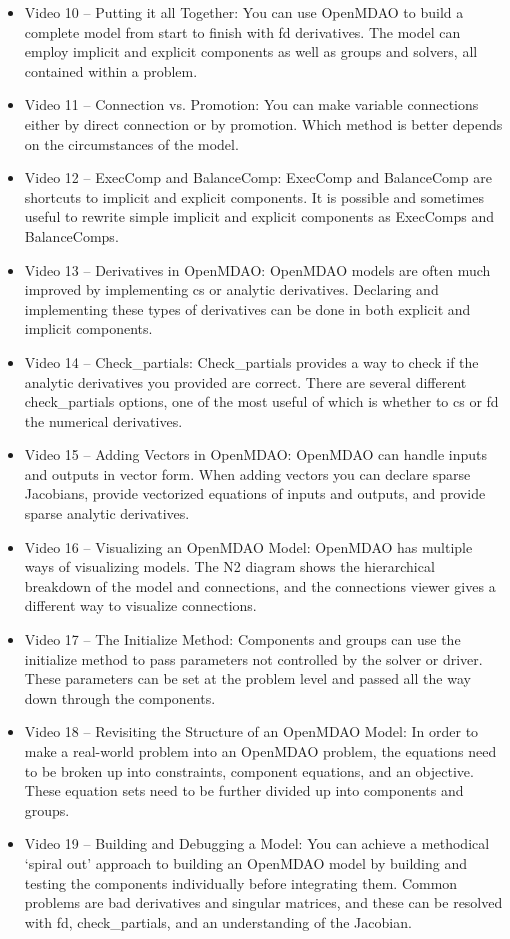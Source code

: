 \documentclass[12pt, letterpaper]{article}
\begin{document}
\begin{itemize}
	\item Video 10 – Putting it all Together: You can use OpenMDAO to build a complete model from start to finish with fd derivatives. The model can employ implicit and explicit components as well as groups and solvers, all contained within a problem.
	\item Video 11 – Connection vs. Promotion: You can make variable connections either by direct connection or by promotion. Which method is better depends on the circumstances of the model.
	\item Video 12 – ExecComp and BalanceComp: ExecComp and BalanceComp are shortcuts to implicit and explicit components. It is possible and sometimes useful to rewrite simple implicit and explicit components as ExecComps and BalanceComps.
	\item Video 13 – Derivatives in OpenMDAO: OpenMDAO models are often much improved by implementing cs or analytic derivatives. Declaring and implementing these types of derivatives can be done in both explicit and implicit components.
	\item Video 14 – Check\_partials: Check\_partials provides a way to check if the analytic derivatives you provided are correct. There are several different check\_partials options, one of the most useful of which is whether to cs or fd the numerical derivatives.
	\item Video 15 – Adding Vectors in OpenMDAO: OpenMDAO can handle inputs and outputs in vector form. When adding vectors you can declare sparse Jacobians, provide vectorized equations of inputs and outputs, and provide sparse analytic derivatives.
	\item Video 16 – Visualizing an OpenMDAO Model: OpenMDAO has multiple ways of visualizing models. The N2 diagram shows the hierarchical breakdown of the model and connections, and the connections viewer gives a different way to visualize connections.
	\item Video 17 – The Initialize Method: Components and groups can use the initialize method to pass parameters not controlled by the solver or driver. These parameters can be set at the problem level and passed all the way down through the components.
	\item Video 18 – Revisiting the Structure of an OpenMDAO Model: In order to make a real-world problem into an OpenMDAO problem, the equations need to be broken up into constraints, component equations, and an objective. These equation sets need to be further divided up into components and groups.
	\item  Video 19 – Building and Debugging a Model: You can achieve a methodical ‘spiral out’ approach to building an OpenMDAO model by building and testing the components individually before integrating them. Common problems are bad derivatives and singular matrices, and these can be resolved with fd, check\_partials, and an understanding of the Jacobian.

\end{itemize}
\end{document}
